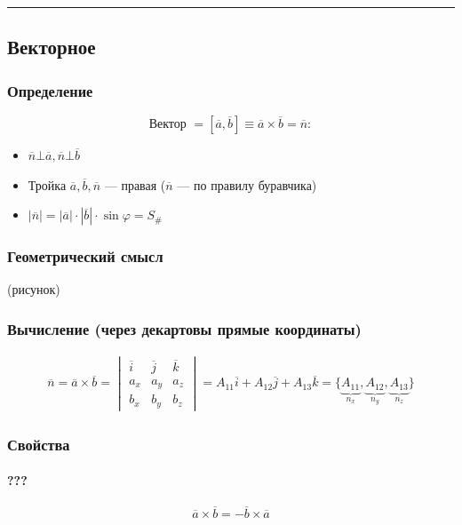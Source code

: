 \documentclass{article}
\begin{document}
\par\noindent\rule{\textwidth}{1pt}
\subsection{Векторное}

\subsubsection{Определение}
\[
    \text{Вектор } = \left[ \overline{a}, \overline{b} \right] \equiv \overline{a} \times \overline{b} = \overline{n}:
\]
\begin{itemize}
    \item $\overline{n} \bot \overline{a}, \overline{n} \bot \overline{b}$
    \item Тройка $\overline{a}, \overline{b}, \overline{n}$ --- правая ($\overline{n}$ --- по правилу буравчика)
    \item $|\overline{n}| = |\overline{a}| \cdot |\overline{b}| \cdot \sin \varphi = S_{\#}$
\end{itemize}


\subsubsection{Геометрический смысл}
(рисунок)

\subsubsection{Вычисление (через декартовы прямые координаты)}
\begin{gather*}
    \overline{n} = \overline{a} \times \overline{b} =
    \begin{vmatrix}
        \overline{i} & \overline{j} & \overline{k} \\
        a_x          & a_y          & a_z          \\
        b_x          & b_y          & b_z
    \end{vmatrix} =
    A_{11} \overline{i} + A_{12} \overline{j} + A_{13} \overline{k} =
    \{\underbrace{A_{11}}_{n_x}, \underbrace{A_{12}}_{n_y}, \underbrace{A_{13}}_{n_z}\}
\end{gather*}


\subsubsection{Свойства}

\paragraph{???}
\[
    \overline{a} \times \overline{b} = -\overline{b} \times \overline{a}
\]
\end{document}
